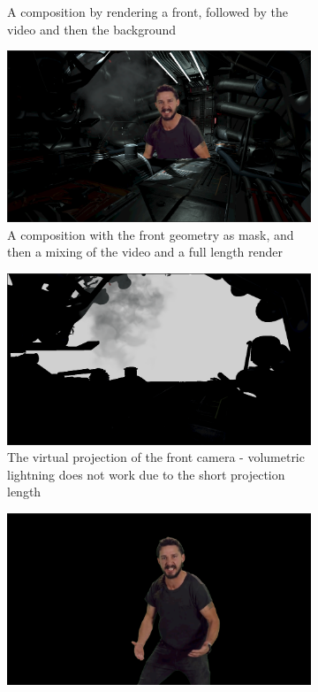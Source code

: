 \begin{figure}[htbp]
\begin{subfigure}[t]{.45\textwidth}
		\caption{A composition by rendering a front, followed by the video and 
		then the background}
	\end{subfigure}
	\begin{subfigure}[t]{.45\textwidth}
		\centering
		\includegraphics[width=\textwidth]{_raw_resources/composition/Composition-Front-Mask.png}
		\caption{A composition with the front geometry as mask, and then a 
		mixing of the video and a full length render}
	\end{subfigure}
	\newline
	\begin{subfigure}[t]{.45\textwidth}
		\centering
		\includegraphics[width=\textwidth]{_raw_resources/composition/Composition-Front.png}
		\caption{The virtual projection of the front camera - volumetric 
		lightning does not work due to the short projection length}
	\end{subfigure}
	\begin{subfigure}[t]{.45\textwidth}
		\centering
		\includegraphics[width=\textwidth]{_raw_resources/composition/Composition-Chroma-Result.png}

\end{subfigure}
\end{figure}

